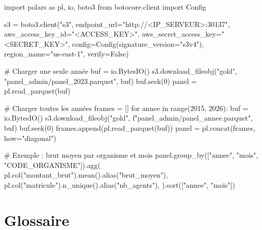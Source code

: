 \documentclass[12pt,a4paper,french]{report}
\begin{document}
\begin{codebox}
import polars as pl, io, boto3
from botocore.client import Config

s3 = boto3.client("s3", endpoint\_url="http://<IP_SERVEUR>:30137",
                  aws\_access\_key\_id="<ACCESS_KEY>",
                  aws\_secret\_access\_key="<SECRET_KEY>",
                  config=Config(signature\_version="s3v4"),
                  region\_name="us-east-1", verify=False)

# Charger une seule année
buf = io.BytesIO()
s3.download\_fileobj("gold", "panel\_admin/panel\_2023.parquet", buf)
buf.seek(0)
panel = pl.read\_parquet(buf)

# Charger toutes les années
frames = []
for annee in range(2015, 2026):
    buf = io.BytesIO()
    s3.download\_fileobj("gold", f"panel\_admin/panel\_{annee}.parquet", buf)
    buf.seek(0)
    frames.append(pl.read\_parquet(buf))
panel = pl.concat(frames, how="diagonal")

# Exemple : brut moyen par organisme et mois
panel.group\_by(["annee", "mois", "CODE\_ORGANISME"]).agg(
    pl.col("montant\_brut").mean().alias("brut\_moyen"),
    pl.col("matricule").n\_unique().alias("nb\_agents"),
).sort(["annee", "mois"])
\end{codebox}

\chapter{Glossaire}
\end{document}
